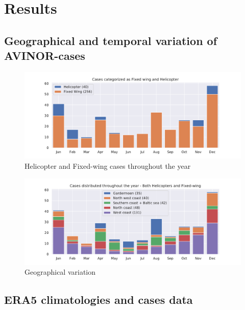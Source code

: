 \chapter{Results}

\section{Geographical and temporal variation of AVINOR-cases}


\begin{figure}
    \centering
    \includegraphics[width=\textwidth]{Figures/helivsfw.pdf}
    \caption{Helicopter and Fixed-wing cases throughout the year}
    \label{fig:helivsfw}
\end{figure}

\begin{figure}
    \centering
    \includegraphics[width=\textwidth]{Figures/soner.pdf}
    \caption{Geographical variation}
    \label{fig:hti}
\end{figure}



\section{ERA5 climatologies and cases data}


